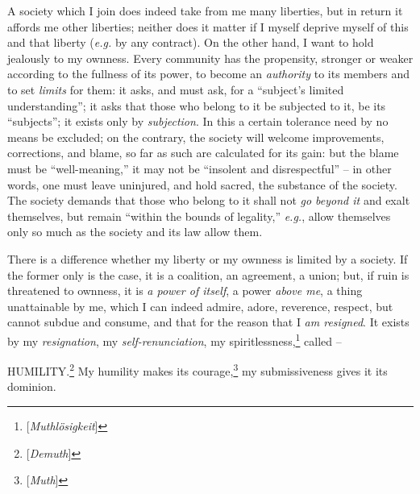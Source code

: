 \documentclass[12pt,a4paper]{book}
\begin{document}
A society which I join does indeed take from me many liberties, but in return 
it affords me other liberties; neither does it matter if I myself deprive 
myself of this and that liberty (\textit{e.g.} by any contract). On the other 
hand, I want to hold jealously to my ownness. Every community has the 
propensity, stronger or weaker according to the fullness of its power, to 
become an \textit{authority} to its members and to set \textit{limits} for 
them: it asks, and must ask, for a ``subject's limited understanding''; it 
asks that those who belong to it be subjected to it, be its ``subjects''; it 
exists only by \textit{subjection}. In this a certain tolerance need by no 
means be excluded; on the contrary, the society will welcome improvements, 
corrections, and blame, so far as such are calculated for its gain: but the 
blame must be ``well-meaning,'' it may not be ``insolent and 
disrespectful'' -- in other words, one must leave uninjured, and hold sacred, 
the substance of the society. The society demands that those who belong to it 
shall not \textit{go beyond it} and exalt themselves, but remain ``within the 
bounds of legality,'' \textit{e.g.}, allow themselves only so much as the 
society and its law allow them.

There is a difference whether my liberty or my ownness is limited by a 
society. If the former only is the case, it is a coalition, an agreement, a 
union; but, if ruin is threatened to ownness, it is \textit{a power of 
itself}, a power \textit{above me}, a thing unattainable by me, which I can 
indeed admire, adore, reverence, respect, but cannot subdue and consume, and 
that for the reason that I \textit{am resigned}. It exists by my 
\textit{resignation}, my \textit{self-renunciation}, my 
spiritlessness,\footnote{[\textit{Muthl\"osigkeit}]} called --

HUMILITY.\footnote{[\textit{Demuth}]} My humility makes its 
courage,\footnote{[\textit{Muth}]} my submissiveness gives it its dominion.
\end{document}
